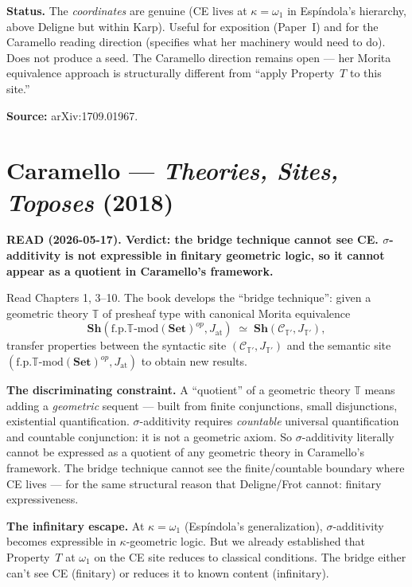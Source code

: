 \medskip\noindent
\textbf{Status.}  The \emph{coordinates} are genuine (CE lives at
$\kappa = \omega_1$ in Esp\'{i}ndola's hierarchy, above Deligne
but within Karp).  Useful for exposition (Paper~I) and for the
Caramello reading direction (specifies what her machinery would
need to do).  Does not produce a seed.  The Caramello direction
remains open --- her Morita equivalence approach is structurally
different from ``apply Property~$T$ to this site.''

\medskip\noindent
\textbf{Source:} arXiv:1709.01967.

\section{Caramello --- \emph{Theories, Sites, Toposes} (2018)}

\textbf{READ (2026-05-17).  Verdict: the bridge technique cannot
see CE.  $\sigma$-additivity is not expressible in finitary
geometric logic, so it cannot appear as a quotient in Caramello's
framework.}

\medskip\noindent
Read Chapters 1, 3--10.  The book develops the ``bridge technique'':
given a geometric theory $\mathbb{T}$ of presheaf type with
canonical Morita equivalence
\[
  \mathbf{Sh}(\text{f.p.}\mathbb{T}\text{-mod}(\mathbf{Set})^{op},
  J_{\mathrm{at}})
  \;\simeq\;
  \mathbf{Sh}(\mathcal{C}_{\mathbb{T}'}, J_{\mathbb{T}'}),
\]
transfer properties between the syntactic site
$(\mathcal{C}_{\mathbb{T}'}, J_{\mathbb{T}'})$ and the semantic
site $(\text{f.p.}\mathbb{T}\text{-mod}(\mathbf{Set})^{op},
J_{\mathrm{at}})$ to obtain new results.

\medskip\noindent
\textbf{The discriminating constraint.}  A ``quotient'' of a
geometric theory $\mathbb{T}$ means adding a \emph{geometric}
sequent --- built from finite conjunctions, small disjunctions,
existential quantification.  $\sigma$-additivity requires
\emph{countable} universal quantification and countable
conjunction: it is not a geometric axiom.  So $\sigma$-additivity
literally cannot be expressed as a quotient of any geometric theory
in Caramello's framework.  The bridge technique cannot see the
finite/countable boundary where CE lives --- for the same
structural reason that Deligne/Frot cannot: finitary
expressiveness.

\medskip\noindent
\textbf{The infinitary escape.}  At $\kappa = \omega_1$
(Esp\'{i}ndola's generalization), $\sigma$-additivity becomes
expressible in $\kappa$-geometric logic.  But we already
established that Property~$T$ at $\omega_1$ on the CE
site reduces to classical conditions.  The bridge either can't see
CE (finitary) or reduces it to known content (infinitary).

